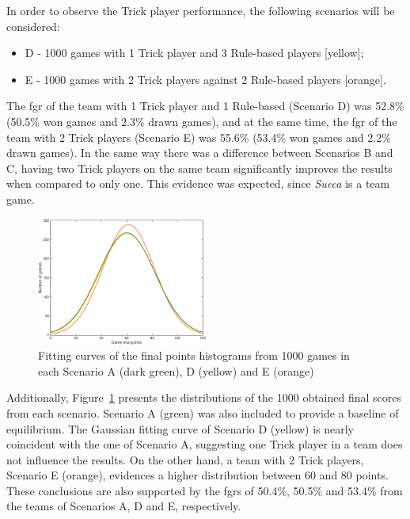 In order to observe the Trick player performance, the following scenarios will be considered:
\begin{itemize}
\item D - 1000 games with 1 Trick player and 3 Rule-based players [yellow];
\item E - 1000 games with 2 Trick players against 2 Rule-based players [orange].
\end{itemize}

The \ac{fgr} of the team with 1 Trick player and 1 Rule-based (Scenario D) was 52.8\% (50.5\% won games and 2.3\% drawn games), and at the same time, the \ac{fgr} of the team with 2 Trick players (Scenario E) was 55.6\% (53.4\% won games and 2.2\% drawn games).
In the same way there was a difference between Scenarios B and C, having two Trick players on the same team significantly improves the results when compared to only one.
This evidence was expected, since \emph{Sueca} is a team game.

\begin{figure}[h!]
  \centering
    \includegraphics[width=0.5\textwidth]{./img/4/ADE}
  \caption{Fitting curves of the final points histograms from 1000 games in each Scenario A (dark green), D (yellow) and E (orange)}
\label{fig:ADE}
\end{figure}

Additionally, Figure~\ref{fig:ADE} presents the distributions of the 1000 obtained final scores from each scenario.
Scenario A (green) was also included to provide a baseline of equilibrium.
The Gaussian fitting curve of Scenario D (yellow) is nearly coincident with the one of Scenario A, suggesting one Trick player in a team does not influence the results.
On the other hand, a team with 2 Trick players, Scenario E (orange), evidences a higher distribution between 60 and 80 points.
These conclusions are also supported by the \acp{fgr} of 50.4\%, 50.5\% and 53.4\% from the teams of Scenarios A, D and E, respectively.

